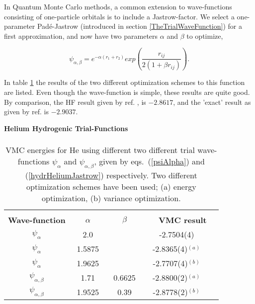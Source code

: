 In Quantum Monte Carlo methods, a common extension to
wave-functions consisting of one-particle
orbitals is to include a Jastrow-factor. We select a
one-parameter Pad\'{e}-Jastrow (introduced in section
\ref{TheTrialWaveFunction}) for a first approximation, and 
now have two parameters $\alpha$ and $\beta$ to optimize,

\begin{equation} 
  \psi_{\alpha,\beta} = e^{-\alpha (r_1+r_2)} 
  exp(\frac{r_{ij}}{2(1 + \beta r_{ij})}).
\label{hydrHeliumJastrow}
\end{equation}

In table \ref{hydrHelium} the results of the two different
optimization schemes to this function are listed. Even though the
wave-function is simple, these results are quite good. By
comparison, the HF result given by ref. \cite{clementi1974}, is
$-2.8617$, and the 'exact' result as given by ref. \cite{hammond1994}
is $-2.9037$.
\newline

\begin{table}[hbtp]
\begin{center} {\large \bf Helium Hydrogenic Trial-Functions} \\ 
$\phantom{a}$ \\
\begin{tabular}{ccccc}
\hline\\ 
{\bf Wave-function} & $\phantom{AA}${\bf $\alpha$}$\phantom{AA}$& $\phantom{AA}${\bf $\beta$}$\phantom{AA}$&$\phantom{AA}${\bf VMC result}  \\
$\psi_{\alpha}$       &       2.0   &              &-2.7504(4)        \\   
$\psi_{\alpha}$       &     1.5875  &              &-2.8365(4)$^{(a)}$\\   
$\psi_{\alpha}$       &     1.9625  &              &-2.7707(4)$^{(b)}$\\   
$\psi_{\alpha,\beta}$ &     1.71    &     0.6625   &-2.8800(2)$^{(a)}$\\
$\psi_{\alpha,\beta}$ &     1.9525  &     0.39     &-2.8778(2)$^{(b)}$\\ [10pt] 
\hline
\end{tabular} 
\end{center}
\caption{VMC energies for He using different two different trial
  wave-functions $\psi_{\alpha}$ and $\psi_{\alpha,\beta} $, given by
  eqs.~(\ref{psiAlpha}) and (\ref{hydrHeliumJastrow}) respectively.
  Two different optimization schemes have been used; (a) energy
  optimization, (b) variance optimization.}
\label{hydrHelium}
\end{table}

